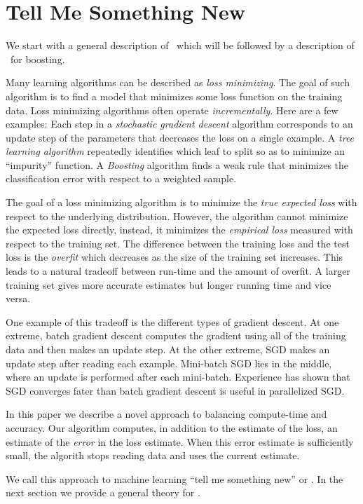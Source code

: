 \section{Tell Me Something New}\label{sec:tmsn}
We start with a general description of \tmsn\ which will be followed
by a description of \tmsn\ for boosting.

Many learning algorithms can be described as {\em loss
  minimizing}. The goal of such algorithm is to find a model that
minimizes some loss function on the training data.  Loss minimizing
algorithms often operate {\em incrementally}. Here are a few examples:
Each step in a {\em stochastic gradient descent} algorithm corresponds
to an update step of the parameters that decreases the loss on a
single example. A {\em tree learning algorithm} repeatedly identifies
which leaf to split so as to minimize an ``impurity'' function. A {\em 
  Boosting} algorithm finds a weak rule that minimizes the
classification error with respect to a weighted sample.

The goal of a loss minimizing algorithm is to minimize the {\em true
  expected loss} with respect to the underlying distribution. However,
the algorithm cannot minimize the expected loss directly, instead, it
minimizes the {\em empirical loss} measured with respect to the
training set. The difference between the training loss and the test
loss is the {\em overfit} which decreases as the size of the training
set increases. This leads to a natural tradeoff between run-time and
the amount of overfit. A larger training set gives more accurate
estimates but longer running time and vice versa.

One example of this tradeoff is the different types of gradient
descent. At one extreme, batch gradient descent computes the gradient
using all of the training data and then makes an update step. At the
other extreme, SGD makes an update step after reading each
example. Mini-batch SGD lies in the middle, where an update is
performed after each mini-batch. Experience has shown that SGD
converges fater than batch gradient descent is useful in parallelized
SGD.

In this paper we describe a novel approach to balancing compute-time
and accuracy. Our algorithm computes, in addition to the estimate of
the loss, an estimate of the {\em error} in the loss estimate. When
this error estimate is sufficiently small, the algorith stops reading
data and uses the current estimate.

We call this approach to machine learning ``tell me something new'' or
\tmsn. In the next section we provide a general theory for \tmsn.

